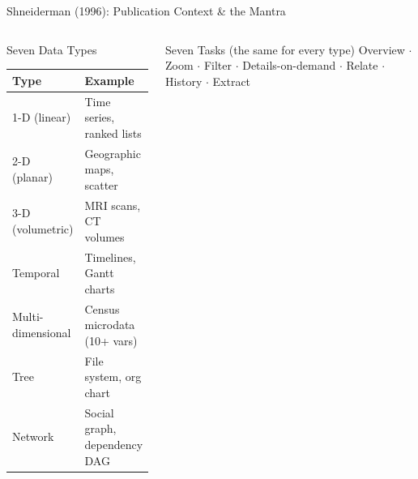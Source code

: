 \documentclass[aspectratio=169,10pt]{beamer}
\begin{document}
\begin{frame}{Shneiderman (1996): Publication Context \& the Mantra}
\begin{columns}[T]
      \begin{block}{Seven Data Types}
        \renewcommand{\arraystretch}{1.2}
        \begin{tabular}{@{}lp{4.0cm}@{}}
          \toprule
          \textbf{Type}       & \textbf{Example} \\
          \midrule
          1-D (linear)        & Time series, ranked lists \\
          2-D (planar)        & Geographic maps, scatter \\
          3-D (volumetric)    & MRI scans, CT volumes \\
          Temporal            & Timelines, Gantt charts \\
          Multi-dimensional   & Census microdata (10+ vars) \\
          Tree                & File system, org chart \\
          Network             & Social graph, dependency DAG \\
          \bottomrule
        \end{tabular}
      \end{block}
      \vspace{4pt}
      \begin{exampleblock}{Seven Tasks (the same for every type)}
        Overview $\cdot$ Zoom $\cdot$ Filter $\cdot$
        Details-on-demand $\cdot$ Relate $\cdot$ History $\cdot$
        Extract
      \end{exampleblock}
  \end{columns}
\end{frame}
\end{document}
